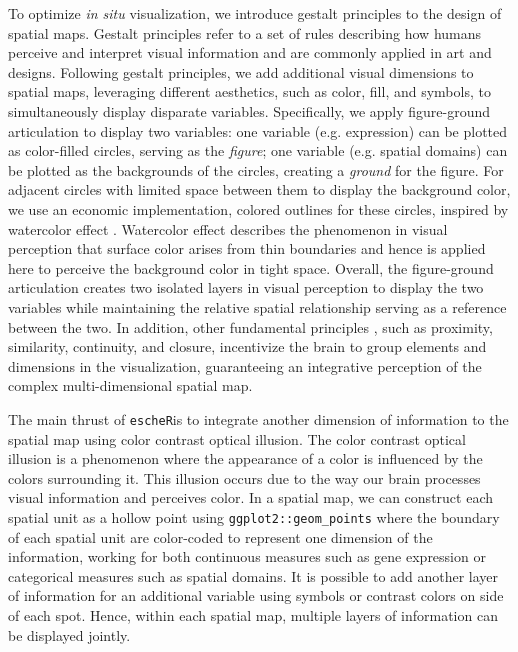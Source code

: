 \documentclass[11pt]{article}
\newcommand{\coloc}{\texttt{escheR}}
\begin{document}
 To optimize \textit{in situ} visualization, we introduce gestalt principles to the design of spatial maps. Gestalt principles \cite{todorovic_2008, palmer_1999} refer to a set of rules describing how humans perceive and interpret visual information and are commonly applied in art and designs. Following gestalt principles, we add additional visual dimensions to spatial maps, leveraging different aesthetics, such as color, fill, and symbols, to simultaneously display disparate variables. Specifically, we apply figure-ground articulation to display two variables: one variable (e.g. expression) can be plotted as color-filled circles, serving as the \textit{figure}; one variable (e.g. spatial domains) can be plotted as the backgrounds of the circles, creating a \textit{ground} for the figure. For adjacent circles with limited space between them to display the background color, we use an economic implementation, colored outlines for these circles, inspired by watercolor effect \cite{pinna_1987, pinna_2001}. Watercolor effect describes the phenomenon in visual perception that surface color arises from thin boundaries and hence is applied here to perceive the background color in tight space. Overall, the figure-ground articulation creates two isolated layers in visual perception to display the two variables while maintaining the relative spatial relationship serving as a reference between the two. In addition, other fundamental principles \cite{todorovic_2008}, such as proximity, similarity, continuity, and closure, incentivize the brain to group elements and dimensions in the visualization, guaranteeing an integrative perception of the complex multi-dimensional spatial map.
 

The main thrust of \coloc is to integrate another dimension of information to the spatial map using color contrast optical illusion. The color contrast optical illusion is a phenomenon where the appearance of a color is influenced by the colors surrounding it. This illusion occurs due to the way our brain processes visual information and perceives color. In a spatial map, we can construct each spatial unit as a hollow point using \texttt{ggplot2::geom\_points} where the boundary of each spatial unit are color-coded to represent one dimension of the information, working for both continuous measures such as gene expression or categorical measures such as spatial domains. It is possible to add another layer of information for an additional variable using symbols or contrast colors on side of each spot. Hence, within each spatial map, multiple layers of information can be displayed jointly.
\end{document}
